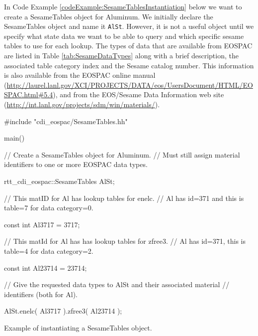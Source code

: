 \documentclass[11pt]{nmemo}
\newenvironment{codeExample}
{\footnotesize 
  \VerbatimEnvironment
  \begin{SaveVerbatim}{\mycode}}%
  {\end{SaveVerbatim}%
  \noindent%
  \parashade[.950]{sharpcorners}{\gdef\outlineboxwidth{.5}%
    \UseVerbatim{\mycode}}\normalsize}
\begin{document}
In Code Example \ref{codeExample:SesameTablesInstantiation} below we
want to create a SesameTables object for Aluminum.  We initially
declare the SesameTables object and name it \texttt{AlSt}.  However,
it is not a useful object until we specify what state data we want to
be able to query and which specific sesame tables to use for each
lookup.  The types of data that are available from EOSPAC are listed
in Table \ref{tab:SesameDataTypes} along with a brief description, the
associated table category index and the Sesame catalog number.  This
information is also available from the EOSPAC online manual
(\url{http://laurel.lanl.gov/XCI/PROJECTS/DATA/eos/UsersDocument/HTML/EOSPAC.html#5.4}),
and from the EOS/Sesame Data Information web site
(\url{http://int.lanl.gov/projects/sdm/win/materials/}).

\begin{cxxSampleCode}
\begin{codeExample}
#include "cdi_eospac/SesameTables.hh"

main()
{
  // Create a SesameTables object for Aluminum.
  // Must still assign material identifiers to one or more EOSPAC data types.
  
  rtt_cdi_eospac::SesameTables AlSt;
  
  // This matID for Al has lookup tables for enelc. 
  // Al has id=371 and this is table=7 for data category=0.

  const int Al3717 = 3717;
  
  // This matId for Al has has lookup tables for zfree3.  
  // Al has id=371, this is table=4 for data category=2.
  
  const int Al23714 = 23714;

 // Give the requested data types to AlSt and their associated material 
 // identifiers (both for Al).

  AlSt.enelc( Al3717 ).zfree3( Al23714 );
}
\end{codeExample}
\caption{Example of instantiating a SesameTables object.}
\label{codeExample:SesameTablesInstantiation}
\end{cxxSampleCode}
\end{document}
